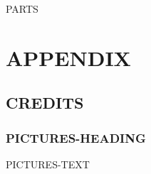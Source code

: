 \documentclass[12pt,fleqn]{book} %
\begin{document}


\pagestyle{empty} %

\tableofcontents %

\cleardoublepage %

\pagestyle{fancy} %

PARTS



\part{APPENDIX}

\chapter{CREDITS}

\section{PICTURES-HEADING}

PICTURES-TEXT





\end{document}
